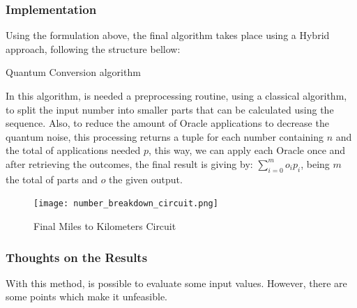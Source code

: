 \documentclass{article}
\begin{document}
\subsubsection{Implementation}

Using the formulation above, the final algorithm takes place using a Hybrid approach, following the structure bellow:

\begin{algorithm}[h]
	\begin{algorithmic}
		\EndFor
			
	\end{algorithmic}
	\caption{Quantum Conversion algorithm}
	\label{alg:miles-to-km-quantum-algortihm}
\end{algorithm}

In this algorithm, is needed a preprocessing routine, using a classical algorithm, to split the input number into smaller parts that can be calculated using the sequence. Also, to reduce the amount of Oracle applications to decrease the quantum noise, this processing returns a tuple for each number containing $n$ and the total of applications needed $p$, this way, we can apply each Oracle once and after retrieving the outcomes, the final result is giving by: $\sum_{i=0}^{m} {o_{i}p_{i}}$, being $m$ the total of parts and $o$ the given output.


\begin{figure}[h]
	\centering
	\texttt{[image: number\_breakdown\_circuit.png]}
	\caption{Final Miles to Kilometers Circuit}
	\label{fig:miles-km-circuit}
\end{figure}


\subsubsection{Thoughts on the Results}

With this method, is possible to evaluate some input values. However, there are some points which make it unfeasible.
\end{document}
